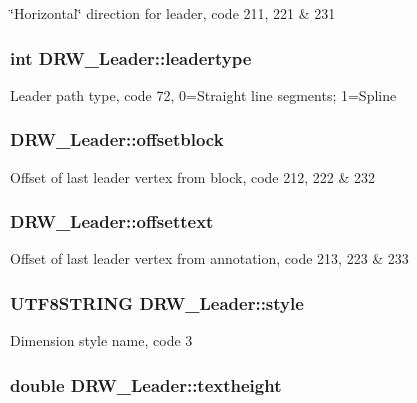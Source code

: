 \char`\"{}\-Horizontal\char`\"{} direction for leader, code 211, 221 \& 231 \hypertarget{classDRW__Leader_a4ba900b63165cb87b79612a9f9b4ff50}{
\subsubsection[{leadertype}]{\setlength{\rightskip}{0pt plus 5cm}int D\-R\-W\-\_\-\-Leader\-::leadertype}}\label{classDRW__Leader_a4ba900b63165cb87b79612a9f9b4ff50}
Leader path type, code 72, 0=Straight line segments; 1=Spline \hypertarget{classDRW__Leader_aa6a2e2b354365f405b52240c9bca3c8a}{
\subsubsection[{offsetblock}]{ D\-R\-W\-\_\-\-Leader\-::offsetblock}}\label{classDRW__Leader_aa6a2e2b354365f405b52240c9bca3c8a}
Offset of last leader vertex from block, code 212, 222 \& 232 \hypertarget{classDRW__Leader_a6326c764bc74feaf7a5a3efa57325f67}{
\subsubsection[{offsettext}]{ D\-R\-W\-\_\-\-Leader\-::offsettext}}\label{classDRW__Leader_a6326c764bc74feaf7a5a3efa57325f67}
Offset of last leader vertex from annotation, code 213, 223 \& 233 \hypertarget{classDRW__Leader_a7a4e898ceae92208a03e86f7857e78e0}{
\subsubsection[{style}]{\setlength{\rightskip}{0pt plus 5cm}U\-T\-F8\-S\-T\-R\-I\-N\-G D\-R\-W\-\_\-\-Leader\-::style}}\label{classDRW__Leader_a7a4e898ceae92208a03e86f7857e78e0}
Dimension style name, code 3 \hypertarget{classDRW__Leader_a5d4c5d32e962710240fc6ffa392c951b}{
\subsubsection[{textheight}]{\setlength{\rightskip}{0pt plus 5cm}double D\-R\-W\-\_\-\-Leader\-::textheight}}\label{classDRW__Leader_a5d4c5d32e962710240fc6ffa392c951b}
